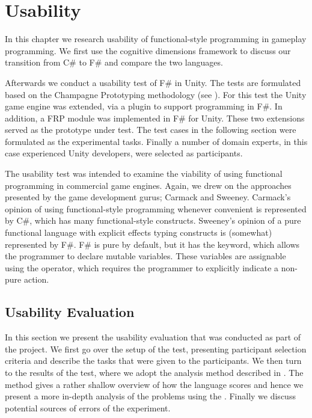 \chapter{Usability}
In this chapter we research usability of functional-style programming in gameplay programming. We first use the cognitive dimensions framework to discuss our transition from C\# to F\# and compare the two languages.

Afterwards we conduct a usability test of F\# in Unity. The tests are formulated based on the Champagne Prototyping methodology (see ). For this test the Unity game engine was extended, via a plugin to support programming in F\#\cite{fsharp2019plugin}. In addition, a \gls{FRP} module was implemented in F\# for Unity. These two extensions served as the prototype under test. The test cases in the following section were formulated as the experimental tasks. Finally a number of domain experts, in this case experienced Unity developers, were selected as participants.

The usability test was intended to examine the viability of using functional programming in commercial game engines. Again, we drew on the approaches presented by the game development gurus; Carmack and Sweeney. Carmack's opinion of using functional-style programming whenever convenient is represented by C\#, which has many functional-style constructs. Sweeney's opinion of a pure functional language with explicit effects typing constructs is (somewhat) represented by F\#. F\# is pure by default, but it has the  keyword, which allows the programmer to declare mutable variables. These variables are assignable using the \ttt{\textless-} operator, which requires the programmer to explicitly indicate a non-pure action.


\section{Usability Evaluation}
In this section we present the usability evaluation that was conducted as part of the project. We first go over the setup of the test, presenting participant selection criteria and describe the tasks that were given to the participants. We then turn to the results of the test, where we adopt the analysis method described in \champagne\cite{blackwell2004champagne}. The \champagne method gives a rather shallow overview of how the language scores and hence we present a more in-depth analysis of the problems using the \cognitive. Finally we discuss potential sources of errors of the experiment.




